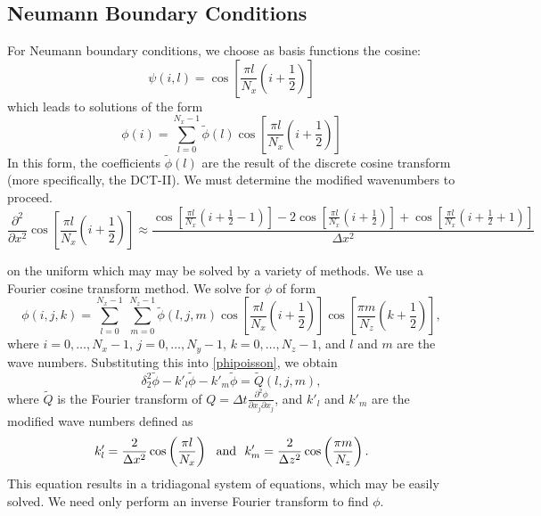 \documentclass[10pt]{article}
\begin{document}
\subsection{Neumann Boundary Conditions}
For Neumann boundary conditions, we choose as basis functions the
cosine:
\begin{equation}
\psi(i,l)=\cos \left[\frac{\pi l}{N_x}\left(i+\frac{1}{2}\right)\right]
\end{equation}
which leads to solutions of the form
\begin{equation}
\phi(i)=\sum^{N_x-1}_{l=0} \tilde{\phi}(l)
\cos \left[\frac{\pi l}{N_x}\left(i+\frac{1}{2}\right)\right]
\end{equation}
In this form, the coefficients $\tilde{\phi}(l)$ are the result of the
discrete cosine transform (more specifically, the DCT-II).  We must
determine the modified wavenumbers to proceed.  
\begin{equation}
\frac{\partial^2}{\partial x^2} 
\cos \left[\frac{\pi l}{N_x}\left(i+\frac{1}{2}\right)\right] \approx
\frac{ \cos \left[\frac{\pi l}{N_x}\left(i+\frac{1}{2}-1\right)\right]
- 2 \cos \left[\frac{\pi l}{N_x}\left(i+\frac{1}{2}\right)\right]
+ \cos \left[\frac{\pi l}{N_x}\left(i+\frac{1}{2}+1\right)\right]}
{\Delta x^2}
\end{equation}

 on the uniform which may may be solved by a variety of
methods.  We use a Fourier cosine transform method.  We solve for
$\phi$ of form
\begin{equation}
\phi(i,j,k)=\sum^{N_x-1}_{l=0}\ \sum^{N_z-1}_{m=0} \tilde{\phi}(l,j,m)
\cos \left[\frac{\pi l}{N_x}\left(i+\frac{1}{2}\right)\right]
\cos \left[\frac{\pi m}{N_z}\left(k+\frac{1}{2}\right)\right],
\end{equation}
where $i=0,\dots ,N_x-1$, $j=0,\dots ,N_y-1$, $k=0,\dots ,N_z-1$, and $l$
and $m$ are the wave numbers.  Substituting this into
\autoref{phipoisson}, we obtain
\begin{equation}\label{phieq}
\delta_2^2 \tilde{\phi} - k'_l\tilde{\phi} -
k'_m\tilde{\phi}=\tilde{Q}(l,j,m),
\end{equation}
where $\tilde{Q}$ is the Fourier transform of $Q=\Delta
t\frac{\partial^2 \phi}{\partial x_j \partial x_j}$, and $k'_l$ and
$k'_m$ are the modified wave numbers defined as
\begin{equation}
k'_l=\frac{2}{\Delta x^2}\cos \left(\frac{\pi l}{N_x}\right)
\hbox{\ \ and\ \ }
k'_m=\frac{2}{\Delta z^2}\cos \left(\frac{\pi m}{N_z}\right).
\end{equation}
This equation results in a tridiagonal system of equations, which may
be easily solved. We need only perform an inverse Fourier transform to
find $\phi$.  
\end{document}
